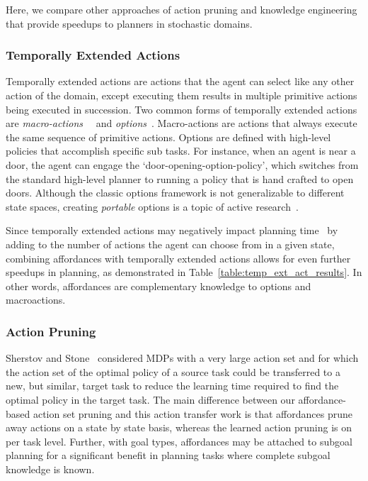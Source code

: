 \documentclass[letterpaper]{article}
\begin{document}
Here, we compare other approaches of action pruning and
knowledge engineering that provide speedups to planners
in stochastic domains.

\subsubsection{Temporally Extended Actions}
Temporally extended actions are actions that the agent can select like
any other action of the domain, except executing them results in
multiple primitive actions being executed in succession. Two common
forms of temporally extended actions are {\em
  macro-actions}~\cite{hauskrecht98} ~and {\em
  options}~\cite{sutton99}.  Macro-actions are actions that always
execute the same sequence of primitive actions. Options are defined
with high-level policies that accomplish specific sub tasks. For
instance, when an agent is near a door, the agent can engage the
`door-opening-option-policy', which switches from the standard
high-level planner to running a policy that is hand crafted to open
doors.  Although the classic options framework is not generalizable to
different state spaces, creating {\em portable} options is a topic of
active
research~\cite{konidaris07,konidaris2009efficient,Ravindran03analgebraic,croonenborghs2008learning,andre2002state,konidaris2012transfer}.

Since temporally extended actions may negatively impact planning
time~\cite{Jong:2008zr} by adding to the number of actions the agent
can choose from in a given state, combining affordances with
temporally extended actions allows for even further speedups in
planning, as demonstrated in Table~\ref{table:temp_ext_act_results}. In
other words, affordances are complementary knowledge to options and
macroactions.

\subsubsection{Action Pruning}

Sherstov and Stone~\cite{sherstov2005improving} considered MDPs with a
very large action set and for which the action set of the optimal
policy of a source task could be transferred to a new, but similar,
target task to reduce the learning time required to find the optimal
policy in the target task. The main difference between our
affordance-based action set pruning and this action transfer work is
that affordances prune away actions on a state by state basis, whereas
the learned action pruning is on per task level. Further, with goal
types, affordances may be attached to subgoal planning for a
significant benefit in planning tasks where complete subgoal knowledge
is known.
\end{document}
